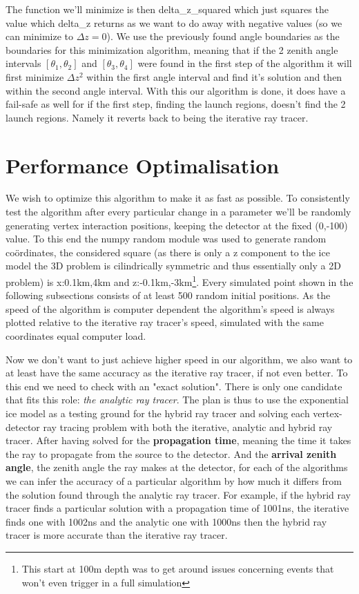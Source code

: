 \documentclass[11pt,a4paper,faculty=we,language=en,doctype=report]{cls/ugent-doc}
\begin{document}
The function we'll minimize is then delta\_z\_squared which just squares the
value which delta\_z returns as we want to do away with negative values (so we
can minimize to $\Delta z=0$). We use the previously found angle boundaries as
the boundaries for this minimization algorithm, meaning that if the 2 zenith
angle intervals $[\theta_1,\theta_2]$ and $[\theta_3,\theta_4]$ were found in
the first step of the algorithm it will first minimize $\Delta z^2$ within the
first angle interval and find it's solution and then within the second angle
interval. With this our algorithm is done, it does have a fail-safe as well for
if the first step, finding the launch regions, doesn't find the 2 launch
regions.  Namely it reverts back to being the iterative ray tracer.

\section{Performance Optimalisation} 
We wish to optimize this algorithm to make
it as fast as possible.  To consistently test the algorithm after every
particular change in a parameter we'll be randomly generating vertex
interaction positions, keeping the detector at the fixed (0,-100) value.  To
this end the numpy random module was used to generate random coördinates, the
considered square (as there is only a z component to the ice model the 3D
problem is cilindrically symmetric and thus essentially only a 2D problem) is
x:0.1km,4km and z:-0.1km,-3km\footnote{This start at 100m depth was to get
around issues concerning events that won't even trigger in a full simulation}.
Every simulated point shown in the following subsections consists of at least
500 random initial positions.  As the speed of the algorithm is computer
dependent the algorithm's speed is always plotted relative to the iterative ray
tracer's speed, simulated with the same coordinates equal computer load.

Now we don't want to just achieve higher speed in our algorithm, we also want
to at least have the same accuracy as the iterative ray tracer, if not even better.
To this end we need to check with an "exact solution". There is only one candidate
that fits this role: \textit{the analytic ray tracer}. The plan is thus to use the
exponential ice model as a testing ground for the hybrid ray tracer and solving each
vertex-detector ray tracing problem with both the iterative, analytic and hybrid ray tracer.
After having solved for the \textbf{propagation time}, meaning the time it takes the ray to
propagate from the source to the detector. And the \textbf{arrival zenith angle}, the zenith angle
the ray makes at the detector, for each of the algorithms we can infer the accuracy of a particular
algorithm by how much it differs from the solution found through the analytic ray tracer.
For example, if the hybrid ray tracer finds a particular solution with a propagation time of 
1001ns, the iterative finds one with 1002ns and the analytic one with 1000ns then the hybrid
ray tracer is more accurate than the iterative ray tracer.
\end{document}

